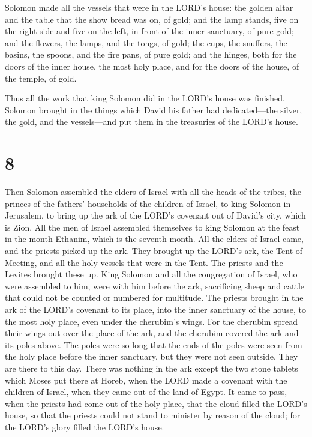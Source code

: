  Solomon made all the vessels that were in the LORD's
house: the golden altar and the table that the show bread was on, of
gold;  and the lamp stands, five on the right side and
five on the left, in front of the inner sanctuary, of pure gold; and the
flowers, the lamps, and the tongs, of gold;  the cups,
the snuffers, the basins, the spoons, and the fire pans, of pure gold;
and the hinges, both for the doors of the inner house, the most holy
place, and for the doors of the house, of the temple, of gold.

 Thus all the work that king Solomon did in the LORD's
house was finished. Solomon brought in the things which David his father
had dedicated---the silver, the gold, and the vessels---and put them in
the treasuries of the LORD's house.

\hypertarget{section-7}{%
\section{8}\label{section-7}}

 Then Solomon assembled the elders of Israel with all the
heads of the tribes, the princes of the fathers' households of the
children of Israel, to king Solomon in Jerusalem, to bring up the ark of
the LORD's covenant out of David's city, which is Zion. 
All the men of Israel assembled themselves to king Solomon at the feast
in the month Ethanim, which is the seventh month.  All the
elders of Israel came, and the priests picked up the ark. 
They brought up the LORD's ark, the Tent of Meeting, and all the holy
vessels that were in the Tent. The priests and the Levites brought these
up.  King Solomon and all the congregation of Israel, who
were assembled to him, were with him before the ark, sacrificing sheep
and cattle that could not be counted or numbered for multitude.
 The priests brought in the ark of the LORD's covenant to
its place, into the inner sanctuary of the house, to the most holy
place, even under the cherubim's wings.  For the cherubim
spread their wings out over the place of the ark, and the cherubim
covered the ark and its poles above.  The poles were so
long that the ends of the poles were seen from the holy place before the
inner sanctuary, but they were not seen outside. They are there to this
day.  There was nothing in the ark except the two stone
tablets which Moses put there at Horeb, when the LORD made a covenant
with the children of Israel, when they came out of the land of Egypt.
 It came to pass, when the priests had come out of the
holy place, that the cloud filled the LORD's house,  so
that the priests could not stand to minister by reason of the cloud; for
the LORD's glory filled the LORD's house.

